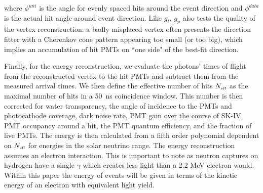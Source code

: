 \noindent where $\phi^{uni}$ is the angle for evenly spaced hits around the event direction and $\phi^{data}$ is the actual hit angle around event direction. Like $g_t$, $g_p$ also tests the quality of the vertex reconstruction: a badly misplaced vertex often presents the direction fitter with a Cherenkov cone pattern appearing too small (or too big), which implies an accumulation of hit PMTs on ``one side" of the best-fit direction.

Finally, for the energy reconstruction, we evaluate the photons' times of flight from the reconstructed vertex to the hit PMTs and subtract them from the measured arrival times. We then define the effective number of hits $N_{\mbox{\tiny eff}}$ as the maximal number of hits in a 50~ns coincidence window.
This number is then corrected for water transparency, the angle of incidence to the PMTs and photocathode coverage, dark noise rate, PMT gain over the course of SK-IV, PMT occupancy around a hit, the PMT quantum efficiency, and the fraction of live PMTs. The energy is then calculated from a fifth order polynomial dependent on $N_{\mbox{\tiny eff}}$ for energies in the solar neutrino range. The energy reconstruction assumes an electron interaction. This is important to note as neutron captures on hydrogen have a single $\gamma$ which creates less light than a 2.2 MeV electron would. Within this paper the energy of events will be given in terms of the kinetic energy of an electron with equivalent light yield.

